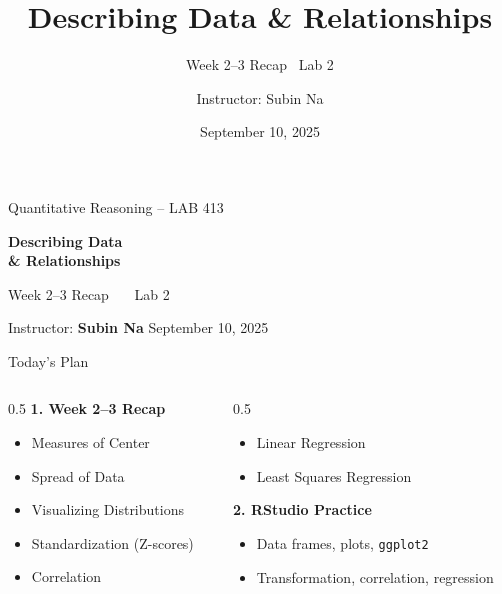 \documentclass[aspectratio=169,11pt]{beamer}
\title{\bfseries Describing Data \& Relationships}
\subtitle{Week 2--3 Recap \textbullet\ Lab 2}
\author{Instructor: Subin Na}
\institute{Quantitative Reasoning -- LAB 413}
\date{September 10, 2025}
\begin{document}
{
\begin{frame}
  \vfill
  {\color{qrgray}\small Quantitative Reasoning -- LAB 413}\\[0.6em]
  {\color{qrnavy}\huge\bfseries Describing Data\\[0.15em]\& Relationships\par}
  \vspace{0.4em}
  {\color{qrblue}\large Week 2--3 Recap \ \textbullet\ \ Lab 2}\par
  \vspace{1.6em}
  {\color{qrgray} Instructor: \textbf{Subin Na} \hfill September 10, 2025}
  \vfill
\end{frame}
}

\begin{frame}{Today's Plan}
  \begin{columns}[T]
    \begin{column}{0.5\textwidth}
      \textbf{\color{qrnavy}1. Week 2--3 Recap}
      \begin{itemize}
        \item Measures of Center
        \item Spread of Data
        \item Visualizing Distributions
        \item Standardization (Z-scores)
        \item Correlation
      \end{itemize}
    \end{column}
    \begin{column}{0.5\textwidth}
      \begin{itemize}
        \item Linear Regression
        \item Least Squares Regression
      \end{itemize}
      \vspace{0.8em}
      \textbf{\color{qrnavy}2. RStudio Practice}
      \begin{itemize}
        \item Data frames, plots, \texttt{ggplot2}
        \item Transformation, correlation, regression
      \end{itemize}
    \end{column}
  \end{columns}
\end{frame}
\end{document}
